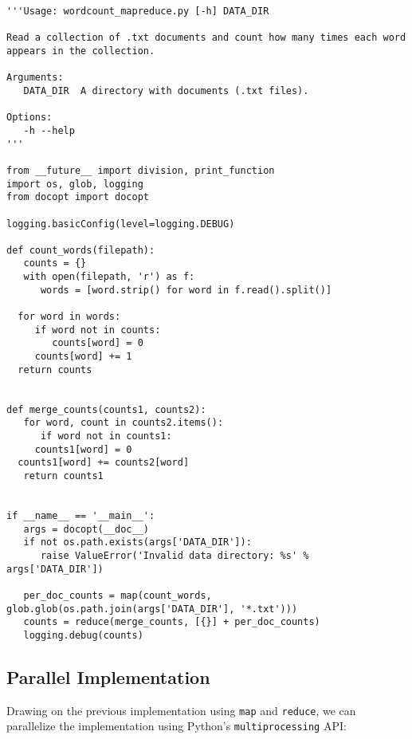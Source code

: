\begin{lstlisting}
'''Usage: wordcount_mapreduce.py [-h] DATA_DIR

Read a collection of .txt documents and count how many times each word
appears in the collection.  

Arguments: 
   DATA_DIR  A directory with documents (.txt files).

Options:
   -h --help
'''

from __future__ import division, print_function
import os, glob, logging
from docopt import docopt

logging.basicConfig(level=logging.DEBUG)

def count_words(filepath):
   counts = {}
   with open(filepath, 'r') as f:
      words = [word.strip() for word in f.read().split()]

  for word in words:
     if word not in counts:
        counts[word] = 0
     counts[word] += 1
  return counts


def merge_counts(counts1, counts2):
   for word, count in counts2.items():
      if word not in counts1:
     counts1[word] = 0
  counts1[word] += counts2[word]
   return counts1


if __name__ == '__main__':
   args = docopt(__doc__)
   if not os.path.exists(args['DATA_DIR']):
      raise ValueError('Invalid data directory: %s' % args['DATA_DIR'])

   per_doc_counts = map(count_words, glob.glob(os.path.join(args['DATA_DIR'], '*.txt')))
   counts = reduce(merge_counts, [{}] + per_doc_counts)
   logging.debug(counts)
\end{lstlisting}

\subsection{Parallel Implementation}

Drawing on the previous implementation using \texttt{map} and
\texttt{reduce}, we can parallelize the implementation using Python's
\texttt{multiprocessing} API:

